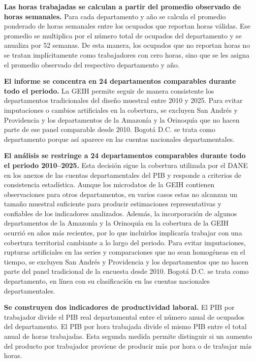 \textbf{Las horas trabajadas se calculan a partir del promedio observado de horas semanales.} Para cada departamento y año se calcula el promedio ponderado de horas semanales entre los ocupados que reportan horas válidas. Ese promedio se multiplica por el número total de ocupados del departamento y se anualiza por 52 semanas. De esta manera, los ocupados que no reportan horas no se tratan implícitamente como trabajadores con cero horas, sino que se les asigna el promedio observado del respectivo departamento y año.

\textbf{El informe se concentra en 24 departamentos comparables durante todo el periodo.} La GEIH permite seguir de manera consistente los departamentos tradicionales del diseño muestral entre 2010 y 2025. Para evitar imputaciones o cambios artificiales en la cobertura, se excluyen San Andrés y Providencia y los departamentos de la Amazonía y la Orinoquía que no hacen parte de ese panel comparable desde 2010. Bogotá D.C. se trata como departamento porque así aparece en las cuentas nacionales departamentales.

\textbf{El análisis se restringe a 24 departamentos comparables durante todo el periodo 2010–2025.} Esta decisión sigue la cobertura utilizada por el DANE en los anexos de las cuentas departamentales del PIB y responde a criterios de consistencia estadística. Aunque los microdatos de la GEIH contienen observaciones para otros departamentos, en varios casos estas no alcanzan un tamaño muestral suficiente para producir estimaciones representativas y confiables de los indicadores analizados. Además, la incorporación de algunos departamentos de la Amazonía y la Orinoquía en la cobertura de la GEIH ocurrió en años más recientes, por lo que incluirlos implicaría trabajar con una cobertura territorial cambiante a lo largo del periodo. Para evitar imputaciones, rupturas artificiales en las series y comparaciones que no sean homogéneas en el tiempo, se excluyen San Andrés y Providencia y los departamentos que no hacen parte del panel tradicional de la encuesta desde 2010. Bogotá D.C. se trata como departamento, en línea con su clasificación en las cuentas nacionales departamentales.

\textbf{Se construyen dos indicadores de productividad laboral.} El PIB por trabajador divide el PIB real departamental entre el número anual de ocupados del departamento. El PIB por hora trabajada divide el mismo PIB entre el total anual de horas trabajadas. Esta segunda medida permite distinguir si un aumento del producto por trabajador proviene de producir más por hora o de trabajar más horas.

